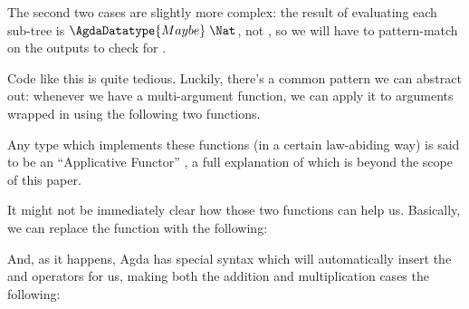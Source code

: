 The second two cases are slightly more complex: the result of evaluating each
sub-tree is \(\AgdaDatatype{Maybe}\;\Nat\), not \Nat, so we will
have to pattern-match on the outputs to check for
.
\begin{agdalisting*}
\end{agdalisting*}
Code like this is quite tedious.
Luckily, there's a common pattern we can abstract out: whenever we have a
multi-argument function, we can apply it to arguments wrapped in
 using the following two functions.
\begin{multicols}{2} \null \vfill
  \begin{agdalisting*}
  \end{agdalisting*} \vfill \null \columnbreak
  \begin{agdalisting*}
  \end{agdalisting*}
\end{multicols} \noindent
Any type which implements these functions (in a certain law-abiding way) is said
to be an ``Applicative Functor''
\citep{mcbrideApplicativeProgrammingEffects2008}, a full explanation of which is
beyond the scope of this paper.

It might not be immediately clear how those two functions can help us.
Basically, we can replace the  function with the
following:
\begin{agdalisting*}
\end{agdalisting*}
And, as it happens, Agda has special syntax which will automatically insert the
 and \AgdaFunction{\_<*>\_} operators for us, making both the
addition and multiplication cases the following:
\begin{agdalisting*}
\end{agdalisting*}

